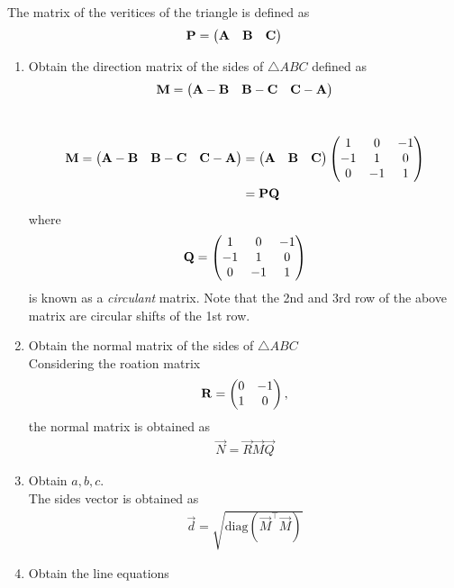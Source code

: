 The matrix of the veritices of the triangle is defined as
		\begin{align}
			\mathbf{P} = \begin{pmatrix}\mathbf{A} & \mathbf{B} &\mathbf{C}\end{pmatrix}
		\end{align}
\begin{enumerate}[label=\thesection.\arabic*.,ref=\thesection.\theenumi]
\item Obtain the direction matrix of the sides of $\triangle ABC$
	defined as 
		\begin{align}
		\mathbf{M} = 	\begin{pmatrix}\mathbf{A}-\mathbf{B} & \mathbf{B}-\mathbf{C} & \mathbf{C}-\mathbf{A}\end{pmatrix}
		\end{align}
	\\
		\solution 

		\begin{align}
			\mathbf{M} = \begin{pmatrix}\mathbf{A}-\mathbf{B} & \mathbf{B}-\mathbf{C} & \mathbf{C}-\mathbf{A}\end{pmatrix}
			&= 
			\begin{pmatrix}\mathbf{A} & \mathbf{B} &\mathbf{C}\end{pmatrix}
			\begin{pmatrix}1 & 0 & -1 \\ -1 & 1 & 0 \\ 0 & -1 & 1\end{pmatrix}
			\\
			&=\mathbf{P}\mathbf{Q}
		\end{align}
		where 
		\begin{align}
\mathbf{Q}= 
			\begin{pmatrix}1 & 0 & -1 \\ -1 & 1 & 0 \\ 0 & -1 & 1\end{pmatrix}
		\end{align}
		is known as a {\em circulant} matrix.  Note that the 2nd and 3rd row of the above matrix are circular shifts of the 1st row.
	\item Obtain the normal matrix  of the sides of $\triangle ABC$
		\\
		\solution Considering the roation matrix
		\begin{align}
			\mathbf{R}  = \begin{pmatrix}0 & -1 \\ 1 & 0\end{pmatrix},
		\end{align}
		the normal matrix is obtained as
		\begin{align}
			\vec{N} = \vec{R}\vec{M}\vec{Q}
		\end{align}

	\item Obtain $a, b, c$.
		\\
		\solution The sides vector is obtained as
		\begin{align}
			\vec{d} = \sqrt{\text{diag}(\vec{M}^{\top}\vec{M})}
		\end{align}
	\item Obtain the line equations
\end{enumerate}
